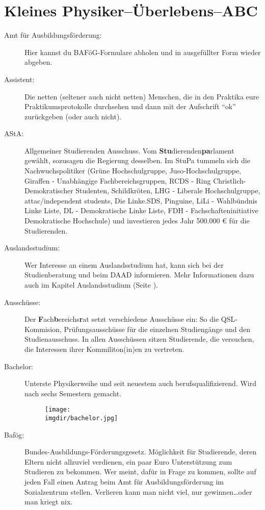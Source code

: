 \section{Kleines Physiker--Überlebens--ABC}
\label{sec:überlebens_abc}
\begin{description}
    \item[Amt für Ausbildungsförderung:] Hier kannst du BAFöG-Formulare abholen und in ausgefüllter Form wieder abgeben.

    \item[Assistent:] Die netten (seltener auch nicht netten) Menschen, die in den Praktika eure Praktikumsprotokolle durchsehen und dann mit der Aufschrift \enquote{ok} zurückgeben (oder auch nicht).

    \item[AStA:] Allgemeiner Studierenden Ausschuss. Vom \textbf{Stu}dierenden\textbf{pa}rlament gewählt, sozusagen die Regierung desselben. Im StuPa tummeln sich die Nachwuchspolitiker (Grüne Hochschulgruppe, Juso-Hochschulgruppe, Giraffen - Unabhängige Fachbereichsgruppen, RCDS - Ring Christlich-Demokratischer Studenten, Schildkröten, LHG - Liberale Hochschulgruppe, attac/independent students, Die Linke.SDS, Pinguine, LiLi - Wahlbündnis Linke Liste, DL - Demokratische Linke Liste, FDH - Fachschafteninitiative Demokratische Hochschule) und investieren jedes Jahr 500.000 \euro{} für die Studierenden.

    \item[Auslandsstudium:] Wer Interesse an einem Auslandsstudium hat, kann sich bei der Studienberatung und beim DAAD informieren. Mehr Informationen dazu auch im Kapitel Auslandsstudium (Seite \pageref{sec:ausland}).

    \item[Ausschüsse:] Der \textbf{F}ach\textbf{b}ereichs\textbf{r}at setzt verschiedene Ausschüsse ein: So die QSL-Kommision, Prüfungsausschüsse für die einzelnen Studiengänge und den Studienausschuss. In allen Ausschüssen sitzen Studierende, die versuchen, die Interessen ihrer Kommiliton(in)en zu vertreten.

    \item[Bachelor:] Unterste Physikerweihe und seit neuestem auch berufsqualifizierend. Wird nach sechs Semestern gemacht.

\begin{figure}[!h]
	\centering
  	\texttt{[image: \\imgdir/bachelor.jpg]}
\end{figure}

    \item[Bafög:] Bundes-Ausbildungs-Förderungsgesetz. Möglichkeit für Studierende, deren Eltern nicht allzuviel verdienen, ein paar Euro Unterstützung zum Studieren zu bekommen. Wer meint, dafür in Frage zu kommen, sollte auf jeden Fall einen Antrag beim Amt für Ausbildungsförderung im Sozialzentrum stellen. Verlieren kann man nicht viel, nur gewinnen\ldots oder man kriegt nix.


\end{description}

